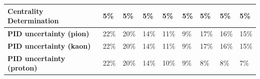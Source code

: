 \begin{table}[]
{\begin{tabular}{lllllllll}
\multicolumn{1}{|l||}{\textbf{Centrality Determination}}                & \multicolumn{1}{l|}{5\%}                                      & \multicolumn{1}{l|}{5\%}                                      & \multicolumn{1}{l|}{5\%}                                      & \multicolumn{1}{l|}{5\%}                                      & \multicolumn{1}{l|}{5\%}                                      & \multicolumn{1}{l|}{5\%}                                      & \multicolumn{1}{l|}{5\%}                                      & \multicolumn{1}{l|}{5\%}                                      \\ \hline
\multicolumn{1}{|l||}{\textbf{PID uncertainty (pion)}}                  & \multicolumn{1}{l|}{22\%}                                     & \multicolumn{1}{l|}{20\%}                                     & \multicolumn{1}{l|}{14\%}                                     & \multicolumn{1}{l|}{11\%}                                     & \multicolumn{1}{l|}{9\%}                                      & \multicolumn{1}{l|}{17\%}                                     & \multicolumn{1}{l|}{16\%}                                     & \multicolumn{1}{l|}{15\%}                                     \\ \hline
\multicolumn{1}{|l||}{\textbf{PID uncertainty (kaon)}}                  & \multicolumn{1}{l|}{22\%}                                     & \multicolumn{1}{l|}{20\%}                                     & \multicolumn{1}{l|}{14\%}                                     & \multicolumn{1}{l|}{11\%}                                     & \multicolumn{1}{l|}{9\%}                                      & \multicolumn{1}{l|}{17\%}                                     & \multicolumn{1}{l|}{16\%}                                     & \multicolumn{1}{l|}{15\%}                                     \\ \hline
\multicolumn{1}{|l||}{\textbf{PID uncertainty (proton)}}                & \multicolumn{1}{l|}{22\%}                                     & \multicolumn{1}{l|}{20\%}                                     & \multicolumn{1}{l|}{14\%}                                     & \multicolumn{1}{l|}{10\%}                                     & \multicolumn{1}{l|}{9\%}                                      & \multicolumn{1}{l|}{8\%}                                      & \multicolumn{1}{l|}{8\%}                                      & \multicolumn{1}{l|}{7\%}                                      \\ \hline
\end{tabular}}


\end{table}
